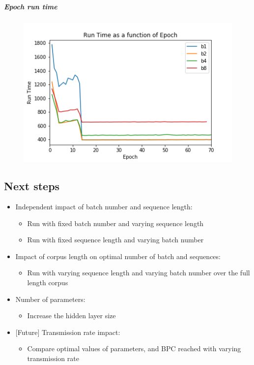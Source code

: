 \subparagraph{Epoch run time}

\begin{figure}[H]
\includegraphics[width=.8\textwidth]{parts/appendix/reports-gmsnn/docs_esteban-latex/test_reports/2018-06-19/b1a8_epoch.png}
\end{figure}

\subsection{Next steps}

\begin{itemize}
\item
  Independent impact of batch number and sequence length:

  \begin{itemize}
  \item
    Run with fixed batch number and varying sequence length
  \item
    Run with fixed sequence length and varying batch number
  \end{itemize}
\item
  Impact of corpus length on optimal number of batch and sequences:

  \begin{itemize}
  \item
    Run with varying sequence length and varying batch number over the
    full length corpus
  \end{itemize}
\item
  Number of parameters:

  \begin{itemize}
  \item
    Increase the hidden layer size
  \end{itemize}
\item
  {[}Future{]} Transmission rate impact:

  \begin{itemize}
  \item
    Compare optimal values of parameters, and BPC reached with varying
    transmission rate
  \end{itemize}
\end{itemize}
